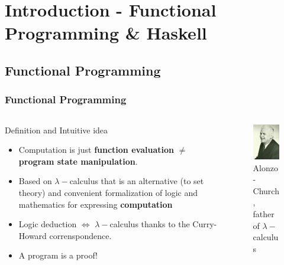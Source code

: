 \section{Introduction - Functional Programming & Haskell } 
\frame{\sectionpage}



\subsection{Functional Programming}

\begin{frame}\frametitle{Functional Programming} 
		
		\begin{columns}[T] %
			\begin{column}{.72\textwidth}
				\begin{block}{Definition and Intuitive idea}
				\begin{itemize}
					  \item Computation is just \textbf{function evaluation} $\neq$ \textbf{program
					  state manipulation}.
					  \item Based on $\lambda-$calculus that is an alternative (to set theory)
					  and convenient formalization of logic and mathematics for expressing
					  \textbf{computation}
					  \item Logic deduction $\Leftrightarrow$ $\lambda-$calculus thanks to the
					  Curry-Howard correnspondence.
					  \item A program is a proof!
				\end{itemize}
				\end{block}

			\end{column}%
				\hfill%
				\begin{column}{.28\textwidth}
				\begin{figure}
					\centering
					\includegraphics[scale=0.5]{images/Alonzo_Church.jpg}
					\caption{Alonzo-Church, father of $\lambda-$calculus}
				\end{figure}
			\end{column}%
		\end{columns}
	\end{frame}

